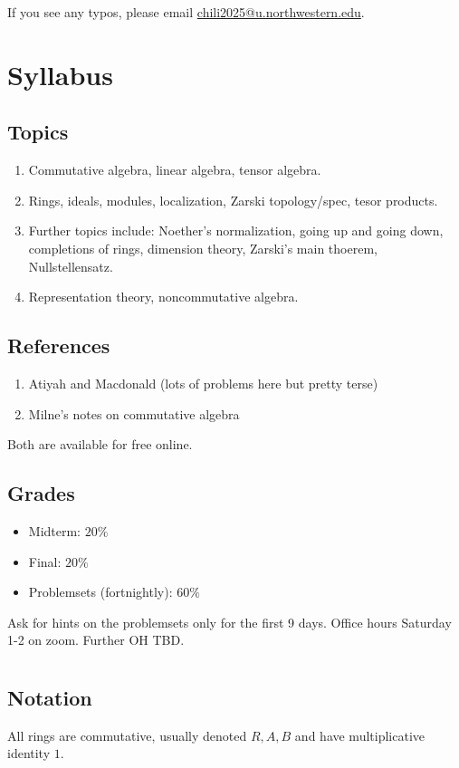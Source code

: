 If you see any typos, please email \href{mailto:chili2025@u.northwestern.edu}{chili2025@u.northwestern.edu}.
\section{Syllabus}
\newsection

\subsection*{Topics}
\begin{enumerate}
    \item Commutative algebra, linear algebra, tensor algebra.
    \item Rings, ideals, modules, localization, Zarski topology/spec, tesor products.
    \item Further topics include: Noether's normalization, going up and going down, completions of rings, dimension theory, Zarski's main thoerem, Nullstellensatz.
    \item Representation theory, noncommutative algebra.
\end{enumerate}
\subsection*{References}
\begin{enumerate}
    \item Atiyah and Macdonald (lots of problems here but pretty terse)
    \item Milne's notes on commutative algebra
\end{enumerate}
Both are available for free online.
\subsection*{Grades}
\begin{itemize}
    \item Midterm: $20\%$
    \item Final: $20\%$
    \item Problemsets (fortnightly): $60\%$
\end{itemize}
Ask for hints on the problemsets only for the first 9 days. Office hours Saturday 1-2 on zoom. Further OH TBD.
\section{}
\subsection*{Notation}
All rings are commutative, usually denoted $R, A, B$ and have multiplicative identity $1$.

